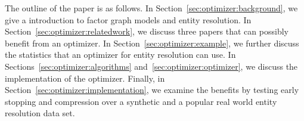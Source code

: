 The outline of the paper is as follows.
In Section~\ref{sec:optimizer:background}, we give a introduction to factor graph models and entity resolution.
In Section~\ref{sec:optimizer:relatedwork}, we discuss three papers that can possibly benefit from an optimizer.
In Section~\ref{sec:optimizer:example}, we further discuss the statistics that an optimizer for entity resolution can use.
In Sections~\ref{sec:optimizer:algorithms} and~\ref{sec:optimizer:optimizer}, we discuss the implementation of the optimizer.
Finally, in Section~\ref{sec:optimizer:implementation}, we examine
the benefits by testing early stopping and compression over a synthetic and a popular real world entity resolution data set.



